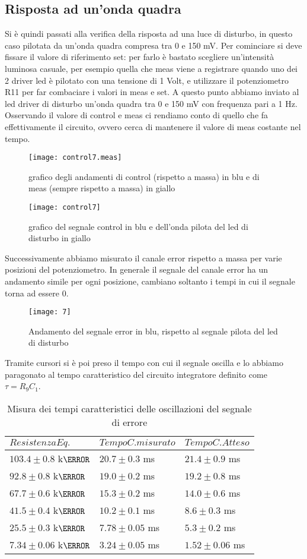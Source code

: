 \documentclass[10pt, a4paper, italian]{article}
\begin{document}
\subsection{Risposta ad un'onda quadra}
Si è quindi passati alla verifica della risposta ad una luce di disturbo, in questo caso pilotata da un'onda quadra compresa tra 0 e 150 mV.
Per cominciare si deve fissare il valore di riferimento set: per farlo è bastato scegliere un'intensità luminosa casuale, per esempio quella che meas viene a registrare quando uno dei 2 driver led è pilotato con una tensione di 1 Volt, e utilizzare il potenziometro R11 per far combaciare i valori in meas e set.
A questo punto abbiamo inviato al led driver di disturbo un'onda quadra tra 0 e 150 mV con frequenza pari a 1 Hz.
Osservando il valore di control e meas ci rendiamo conto di quello che fa effettivamente il circuito, ovvero cerca di mantenere il valore di meas costante nel tempo.
\begin{figure}[H]
    \centering
	\texttt{[image: control7.meas]}
    \caption{grafico degli andamenti di control (rispetto a massa) in blu e di meas (sempre rispetto a massa) in giallo
    \label{fig: Draft1}}
\end{figure}
\begin{figure}[H]
    \centering
	\texttt{[image: control7]}
    \caption{grafico del segnale control in blu e dell'onda pilota del led di disturbo in giallo
    \label{fig: Draft1}}
\end{figure}
Successivamente abbiamo misurato il canale error rispetto a massa per varie posizioni del potenziometro. In generale il segnale del canale error ha un andamento simile per ogni posizione, cambiano soltanto i tempi in cui il segnale torna ad essere 0.
\begin{figure}[H]
    \centering
	\texttt{[image: 7]}
    \caption{Andamento del segnale error in blu, rispetto al segnale pilota del led di disturbo
    \label{fig: Draft1}}
\end{figure}
Tramite cursori si è poi preso il tempo con cui il segnale oscilla e lo abbiamo paragonato al tempo caratteristico del circuito integratore definito come $\tau = R_9C_1$.
\begin{table}[H]
\centering
\begin{tabular}{@{}lll@{}}
\toprule
$Resistenza Eq.$ & $Tempo C. misurato$ & $Tempo C. Atteso$\\
\midrule
$103.4 \pm 0.8 $ k$\ohm$ & $20.7 \pm 0.3$ ms  	& $ 21.4 \pm 0.9$ ms	\\
$92.8 \pm 0.8$ k$\ohm$ & $19.0 \pm 0.2$ ms 	& $ 19.2 \pm 0.8 $ ms	\\
$67.7 \pm 0.6$ k$\ohm$ & $15.3 \pm 0.2$ ms 	& $ 14.0 \pm 0.6 $ ms\\
$41.5 \pm 0.4$ k$\ohm$ & $10.2 \pm 0.1$ 	ms & $ 8.6 \pm 0.3 $ ms\\
$25.5 \pm 0.3$ k$\ohm$ & $7.78 \pm 0.05$ 	ms & $ 5.3 \pm 0.2 $ ms\\
$7.34 \pm0.06$ k$\ohm$ & $3.24 \pm 0.05$ 	ms & $ 1.52 \pm 0.06$ ms\\

\bottomrule
\end{tabular}
\caption{Misura dei tempi caratteristici delle oscillazioni del segnale di errore}
\end{table}
\end{document}
